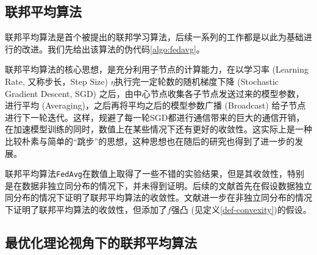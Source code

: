 \subsection{联邦平均算法}
\label{subsec:chap2-overview-fedavg}

联邦平均算法\cite{mcmahan2017fed_avg}是首个被提出的联邦学习算法，后续一系列的工作都是以此为基础进行的改进。我们先给出该算法的伪代码\ref{algo:fedavg}。



联邦平均算法的核心思想，是充分利用子节点的计算能力，在以学习率 (Learning Rate, 又称步长，Step Size) $\eta$执行完一定轮数的随机梯度下降 (Stochastic Gradient Descent, SGD)\cite{Robbins_1951_sgd} 之后，由中心节点收集各子节点发送过来的模型参数，进行平均 (Averaging)，之后再将平均之后的模型参数广播 (Broadcast) 给子节点进行下一轮迭代。这样，规避了每一轮SGD都进行通信带来的巨大的通信开销，在加速模型训练的同时，数值上在某些情况下还有更好的收敛性。这实际上是一种比较朴素与简单的``跳步''的思想，这种思想也在随后的研究\cite{zhang2020fedpd, proxskip, proxskip-vr}也得到了进一步的发展。

联邦平均算法\texttt{FedAvg}在数值上取得了一些不错的实验结果\cite[Section 3]{mcmahan2017fed_avg}，但是其收敛性，特别是在数据非独立同分布的情况下，并未得到证明\cite{khaled2019_first,Khaled2020_tighter}。后续的文献\parencite{zhou_2018_convergence}首先在假设数据独立同分布的情况下证明了联邦平均算法的收敛性。文献\parencite{li2019convergence}进一步在非独立同分布的情况下证明了联邦平均算法的收敛性，但添加了$f$强凸 (见定义\ref{def-convexity})的假设。


\subsection{最优化理论视角下的联邦平均算法}
\label{subsec:chap2-overview-fedavg-opt}

